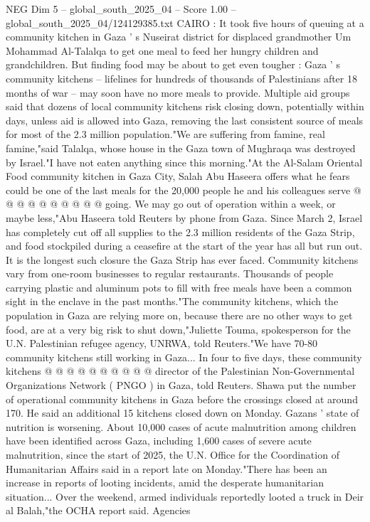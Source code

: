 \begin{textsample}{NEG Dim 5 – global\_south\_2025\_04 – Score 1.00 – global\_south\_2025\_04/124129385.txt}  \label{ex:f5_neg_392}
CAIRO : It took five hours of queuing at a community kitchen in Gaza ' s Nuseirat district for displaced grandmother Um Mohammad Al-Talalqa to get one meal to feed her hungry children and grandchildren.
But finding food may be about to get even tougher : Gaza ' s community kitchens -- lifelines for hundreds of thousands of Palestinians after 18 months of war -- may soon have no more meals to provide.
Multiple aid groups said that dozens of local community kitchens risk closing down, potentially within days, unless aid is allowed into Gaza, removing the last consistent source of meals for most of the 2.3 million population."We are suffering from famine, real famine,"said Talalqa, whose house in the Gaza town of Mughraqa was destroyed by Israel."I have not eaten anything since this morning."At the Al-Salam Oriental Food community kitchen in Gaza City, Salah Abu Haseera offers what he fears could be one of the last meals for the 20,000 people he and his colleagues serve @ @ @ @ @ @ @ @ @ @ going.
We may go out of operation within a week, or maybe less,"Abu Haseera told Reuters by phone from Gaza.
Since March 2, Israel has completely cut off all supplies to the 2.3 million residents of the Gaza Strip, and food stockpiled during a ceasefire at the start of the year has all but run out.
It is the longest such closure the Gaza Strip has ever faced.
Community kitchens vary from one-room businesses to regular restaurants.
Thousands of people carrying plastic and aluminum pots to fill with free meals have been a common sight in the enclave in the past months."The community kitchens, which the population in Gaza are relying more on, because there are no other ways to get food, are at a very big risk to shut down,"Juliette Touma, spokesperson for the U.N.
Palestinian refugee agency, UNRWA, told Reuters."We have 70-80 community kitchens still working in Gaza...
In four to five days, these community kitchens @ @ @ @ @ @ @ @ @ @ director of the Palestinian Non-Governmental Organizations Network ( PNGO ) in Gaza, told Reuters.
Shawa put the number of operational community kitchens in Gaza before the crossings closed at around 170.
He said an additional 15 kitchens closed down on Monday.
Gazans ' state of nutrition is worsening.
About 10,000 cases of acute malnutrition among children have been identified across Gaza, including 1,600 cases of severe acute malnutrition, since the start of 2025, the U.N.
Office for the Coordination of Humanitarian Affairs said in a report late on Monday."There has been an increase in reports of looting incidents, amid the desperate humanitarian situation...
Over the weekend, armed individuals reportedly looted a truck in Deir al Balah,"the OCHA report said.
Agencies

\end{textsample}
